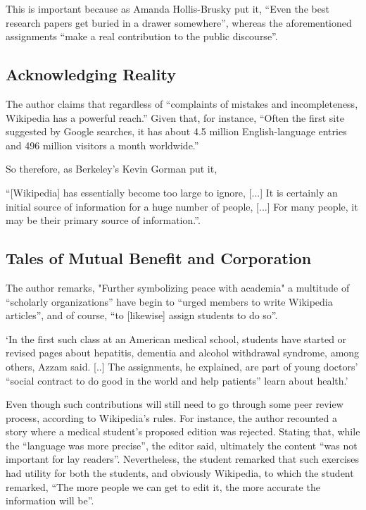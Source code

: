 This is important because as Amanda Hollis-Brusky put it, ``Even the best research papers get buried in a drawer somewhere'', whereas the aforementioned assignments ``make a real contribution to the public discourse''.



\subsection{Acknowledging Reality}

The author claims that regardless of ``complaints of mistakes and incompleteness, Wikipedia has a powerful reach.'' Given that, for instance, ``Often the first site suggested by Google searches, it has about 4.5 million English-language entries and 496 million visitors a month worldwide.''

So therefore, as Berkeley’s Kevin Gorman put it,

``[Wikipedia] has essentially become too large to ignore, [...] It is certainly an initial source of information for a huge number of people, [...] For many people, it may be their primary source of information.''. 


\subsection{Tales of Mutual Benefit and Corporation}

The author remarks, "Further symbolizing peace with academia" a multitude of ``scholarly organizations'' have begin to ``urged members to write Wikipedia articles'', and of course, ``to [likewise] assign students to do so''.

`In the first such class at an American medical school, students have started or revised pages about hepatitis, dementia and alcohol withdrawal syndrome, among others, Azzam said. [..] The assignments, he explained, are part of young doctors’ “social contract to do good in the world and help patients” learn about health.'

Even though such contributions will still need to go through some peer review process, according to Wikipedia's rules. For instance, the author recounted a story where a medical student's proposed edition was rejected. Stating that, while the ``language was more precise'', the editor said, ultimately the content ``was not important for lay readers''. Nevertheless, the student remarked that such exercises had utility for both the students, and obviously Wikipedia, to which the student remarked, ``The more people we can get to edit it, the more accurate the information will be''.


